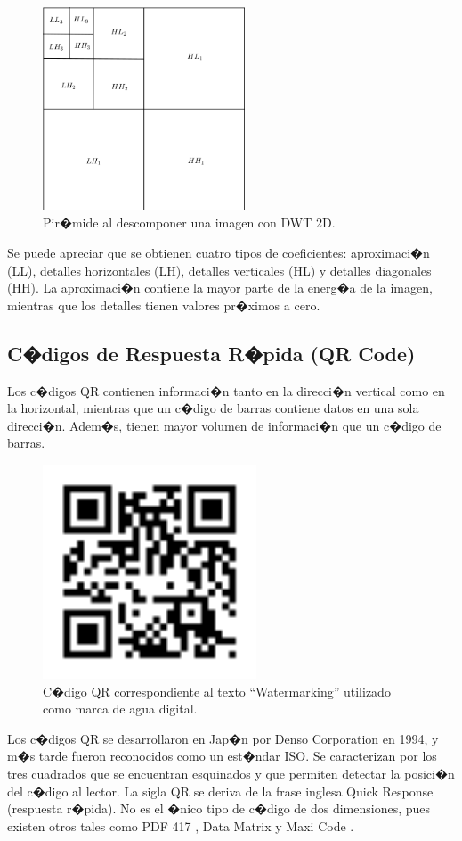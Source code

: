 \documentclass{rcci} %
\begin{document}
\begin{figure}[H]	%
\centering
\includegraphics[width=6cm]{DWT2a} %
\caption{Pir�mide al descomponer una imagen con DWT 2D.}
\label{piramide}
\end{figure}

Se puede apreciar que se obtienen  cuatro  tipos  de  coeficientes:
aproximaci�n (LL),  detalles  horizontales (LH),  detalles  verticales (HL) y detalles  diagonales (HH).  La  aproximaci�n  contiene  la  mayor parte  de  la  energ�a  de  la  imagen, mientras  que  los  detalles  tienen  valores pr�ximos a cero.


\subsection{C�digos de Respuesta R�pida (QR Code)}

Los c�digos QR contienen informaci�n tanto en la direcci�n vertical como en la horizontal, mientras que un c�digo de barras contiene datos en una sola direcci�n.
Adem�s, tienen mayor volumen de informaci�n que un c�digo de barras.

\begin{figure}[h]	%
\centering
\includegraphics[width=2.5in]{Watermarking1} %
\caption{C�digo QR correspondiente al texto ``Watermarking'' utilizado como marca de agua digital.}
\label{qr_code}
\end{figure}
Los c�digos QR se desarrollaron en Jap�n por Denso Corporation en
1994, y m�s tarde fueron reconocidos como un est�ndar ISO. Se caracterizan
por los tres cuadrados que se encuentran esquinados y que permiten
detectar la posici�n del c�digo al lector. La sigla QR se deriva de
la frase inglesa Quick Response (respuesta r�pida). No es el �nico
tipo de c�digo de dos dimensiones, pues existen otros tales como PDF
417 \parencite{Hahn2002}, Data Matrix \parencite{Plain-Jones1995} y Maxi
Code \parencite{He2002}.
\end{document}
